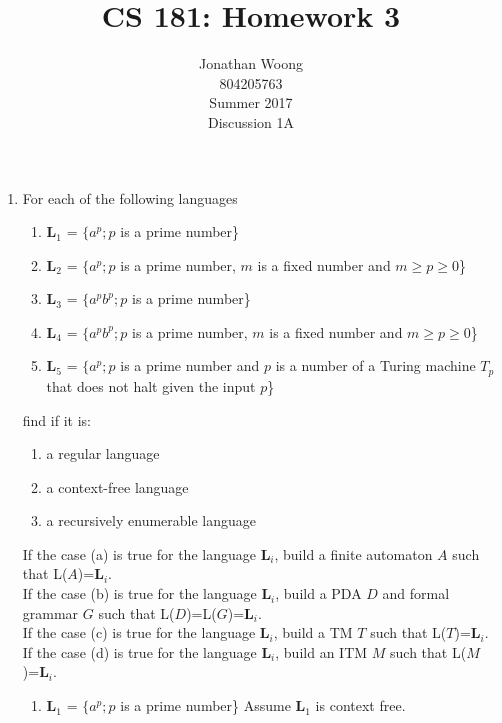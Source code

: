 \documentclass[10.5pt,letterpaper]{article}
\date{\displaydate{date}}
\begin{document}
\title{CS 181: Homework 3}
\author{
	Jonathan Woong\\
	804205763\\
	Summer 2017\\
	Discussion 1A}
\maketitle
\pagebreak


\begin{enumerate}[label=\textbf{Problem \arabic*.}]
\item For each of the following languages
	\begin{enumerate}[label=\roman*)]
		\item \textbf{L$_1$} = $\{a^p;p$ is a prime number\}
		\item \textbf{L$_2$} = $\{a^p;p$ is a prime number, $m$ is a fixed number and $m\geq p\geq 0$\}
		\item \textbf{L$_3$} = $\{a^pb^p;p$ is a prime number\}
		\item \textbf{L$_4$} = $\{a^pb^p;p$ is a prime number, $m$ is a fixed number and $m\geq p\geq 0$\}
		\item \textbf{L$_5$} = $\{a^p;p$ is a prime number and $p$ is a number of a Turing machine $T_p$ that does not halt given the input $p$\}
	\end{enumerate}
	find if it is:
	\begin{enumerate}[label=\alph*)]
		\item a regular language
		\item a context-free language
		\item a recursively enumerable language
	\end{enumerate}
	If the case (a) is true for the language \textbf{L}$_i$, build a finite automaton $A$ such that L($A$)=\textbf{L}$_i$.\\
	If the case (b) is true for the language \textbf{L}$_i$, build a PDA $D$ and formal grammar $G$ such that L($D$)=L($G$)=\textbf{L}$_i$.\\
	If the case (c) is true for the language \textbf{L}$_i$, build a TM $T$ such that L($T$)=\textbf{L}$_i$.\\
	If the case (d) is true for the language \textbf{L}$_i$, build an ITM $M$ such that L($M$)=\textbf{L}$_i$.
	\begin{enumerate}[label=\roman*)]
		\item \textbf{L$_1$} = $\{a^p;p$ is a prime number\}
			Assume \textbf{L$_1$} is context free.\\

\end{enumerate}
\end{enumerate}
\end{document}
